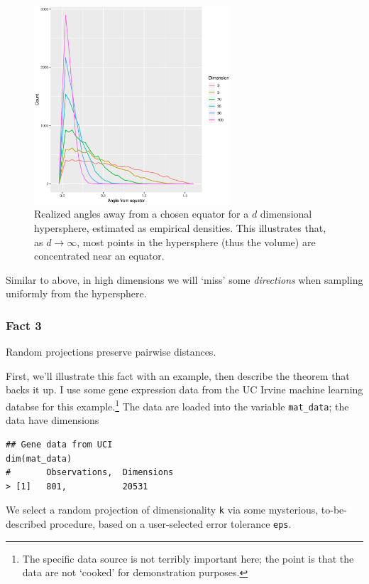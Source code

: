 \documentclass{article}
\begin{document}
\begin{figure}[!ht]
  \centering
  \includegraphics[width=0.65\textwidth]{../../images/equator}
  \caption{Realized angles away from a chosen equator for a $d$ dimensional
    hypersphere, estimated as empirical densities. This illustrates that, as
    $d\to\infty$, most points in the hypersphere (thus the volume) are
    concentrated near an equator.}
  \label{fig:equator}
\end{figure}

Similar to above, in high dimensions we will `miss' some \emph{directions} when
sampling uniformly from the hypersphere.

\clearpage
\subsubsection{Fact 3}
Random projections preserve pairwise distances.

\bigskip
First, we'll illustrate this fact with an example, then describe the theorem
that backs it up. I use some gene expression data from the UC Irvine machine
learning databse\cite{blake1998uci} for this example.\footnote{The specific data
  source is not terribly important here; the point is that the data are not
  `cooked' for demonstration purposes.} The data are loaded into the variable
\lstinline{mat_data}; the data have dimensions

\begin{lstlisting}
## Gene data from UCI
dim(mat_data)
#       Observations,  Dimensions
> [1]   801,           20531
\end{lstlisting}

We select a random projection of dimensionality \lstinline{k} via some
mysterious, to-be-described procedure, based on a user-selected error tolerance
\lstinline{eps}.
\end{document}
